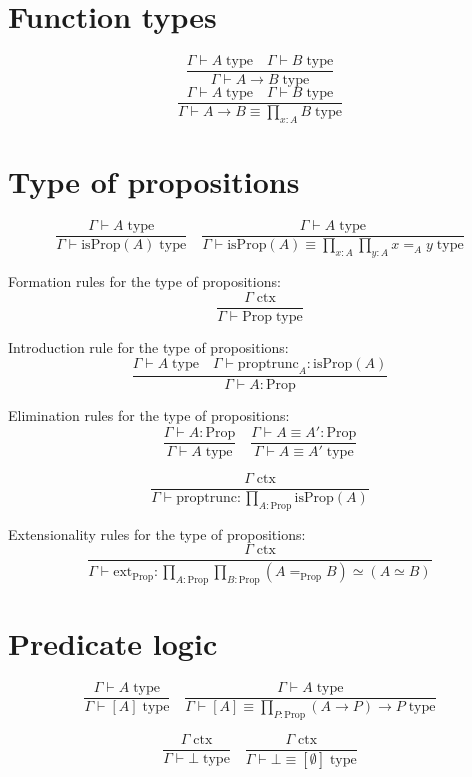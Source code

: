 \documentclass{book}
\begin{document}
\section{Function types}
$$\frac{\Gamma \vdash A \; \mathrm{type} \quad \Gamma \vdash B \; \mathrm{type}}{\Gamma \vdash A \to B \; \mathrm{type}}$$
$$\frac{\Gamma \vdash A \; \mathrm{type} \quad \Gamma \vdash B \; \mathrm{type}}{\Gamma \vdash A \to B \equiv \prod_{x:A} B \; \mathrm{type}}$$

\section{Type of propositions}

$$\frac{\Gamma \vdash A \; \mathrm{type}}{\Gamma \vdash \mathrm{isProp}(A) \; \mathrm{type}} \quad \frac{\Gamma \vdash A \; \mathrm{type}}{\Gamma \vdash \mathrm{isProp}(A) \equiv \prod_{x:A} \prod_{y:A} x =_A y \; \mathrm{type}}$$

Formation rules for the type of propositions:
$$\frac{\Gamma \; \mathrm{ctx}}{\Gamma \vdash \mathrm{Prop} \; \mathrm{type}}$$

Introduction rule for the type of propositions:
$$\frac{\Gamma \vdash A \; \mathrm{type} \quad \Gamma \vdash \mathrm{proptrunc}_A:\mathrm{isProp}(A)}{\Gamma \vdash A:\mathrm{Prop}}$$

Elimination rules for the type of propositions:
$$\frac{\Gamma \vdash A:\mathrm{Prop}}{\Gamma \vdash A \; \mathrm{type}} \quad \frac{\Gamma \vdash A \equiv A':\mathrm{Prop}}{\Gamma \vdash A \equiv A' \; \mathrm{type}}$$

$$\frac{\Gamma \; \mathrm{ctx}}{\Gamma \vdash \mathrm{proptrunc}:\prod_{A:\mathrm{Prop}} \mathrm{isProp}(A)}$$

Extensionality rules for the type of propositions:
$$\frac{\Gamma \; \mathrm{ctx}}{\Gamma \vdash \mathrm{ext}_{\mathrm{Prop}}:\prod_{A:\mathrm{Prop}} \prod_{B:\mathrm{Prop}} (A =_{\mathrm{Prop}} B) \simeq (A \simeq B)}$$

\section{Predicate logic}

$$\frac{\Gamma \vdash A \; \mathrm{type}}{\Gamma \vdash [A] \; \mathrm{type}} \quad \frac{\Gamma \vdash A \; \mathrm{type}}{\Gamma \vdash [A] \equiv \prod_{P:\mathrm{Prop}} (A \to P) \to P \; \mathrm{type}}$$

$$\frac{\Gamma \; \mathrm{ctx}}{\Gamma \vdash \bot \; \mathrm{type}} \quad \frac{\Gamma \; \mathrm{ctx}}{\Gamma \vdash \bot \equiv [\emptyset] \; \mathrm{type}}$$
\end{document}
